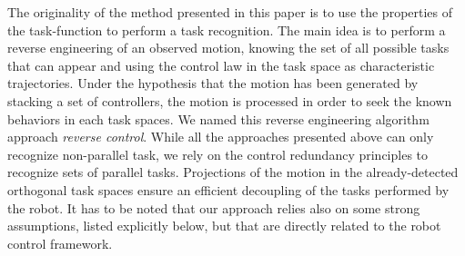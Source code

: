 \documentclass[journal]{IEEEtran}
\begin{document}
The originality of the method presented in this paper is to use the properties of the
task-function to perform a task recognition. The main idea is
to perform a reverse engineering of an observed motion, knowing the set of all possible tasks that can appear
and using the control law in the task space as characteristic trajectories.
Under the hypothesis that the motion has been generated by stacking a set of controllers,
the motion is processed in order to seek the known behaviors in each task spaces.
We named this reverse engineering algorithm approach \emph{reverse control}.
While all the approaches presented above can only recognize non-parallel task,
we rely on the control redundancy principles to recognize sets of parallel tasks.
Projections of the motion in the already-detected orthogonal task spaces
ensure an efficient decoupling of the tasks performed
by the robot.
It has to be noted that our approach relies also on some strong assumptions, listed explicitly below,
but that are directly related to the robot control framework.
%
%
\end{document}
